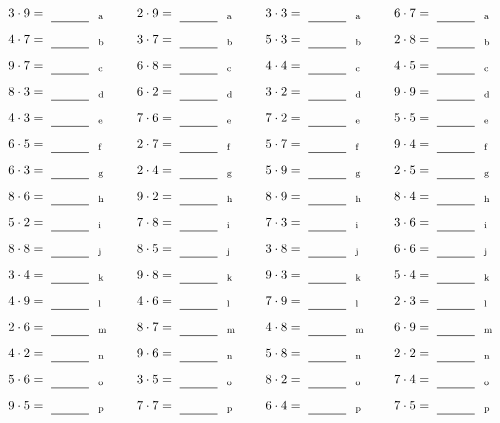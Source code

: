 \documentclass
[
  draft    = true,
  fontsize = 11pt,
  parskip  = half-
]
{scrartcl}
\begin{document}
\par\vfill\par
\begin{align*}
    \pline{3\cdot9}&=\rline{a}
  & \pline{2\cdot9}&=\rline{a}
  & \pline{3\cdot3}&=\rline{a}
  & \pline{6\cdot7}&=\rline{a} \\[1ex]
    \pline{4\cdot7}&=\rline{b}
  & \pline{3\cdot7}&=\rline{b}
  & \pline{5\cdot3}&=\rline{b}
  & \pline{2\cdot8}&=\rline{b} \\[1ex]
    \pline{9\cdot7}&=\rline{c}
  & \pline{6\cdot8}&=\rline{c}
  & \pline{4\cdot4}&=\rline{c}
  & \pline{4\cdot5}&=\rline{c} \\[1ex]
    \pline{8\cdot3}&=\rline{d}
  & \pline{6\cdot2}&=\rline{d}
  & \pline{3\cdot2}&=\rline{d}
  & \pline{9\cdot9}&=\rline{d} \\[1ex]
    \pline{4\cdot3}&=\rline{e}
  & \pline{7\cdot6}&=\rline{e}
  & \pline{7\cdot2}&=\rline{e}
  & \pline{5\cdot5}&=\rline{e} \\[1ex]
    \pline{6\cdot5}&=\rline{f}
  & \pline{2\cdot7}&=\rline{f}
  & \pline{5\cdot7}&=\rline{f}
  & \pline{9\cdot4}&=\rline{f} \\[1ex]
    \pline{6\cdot3}&=\rline{g}
  & \pline{2\cdot4}&=\rline{g}
  & \pline{5\cdot9}&=\rline{g}
  & \pline{2\cdot5}&=\rline{g} \\[1ex]
    \pline{8\cdot6}&=\rline{h}
  & \pline{9\cdot2}&=\rline{h}
  & \pline{8\cdot9}&=\rline{h}
  & \pline{8\cdot4}&=\rline{h} \\[1ex]
    \pline{5\cdot2}&=\rline{i}
  & \pline{7\cdot8}&=\rline{i}
  & \pline{7\cdot3}&=\rline{i}
  & \pline{3\cdot6}&=\rline{i} \\[1ex]
    \pline{8\cdot8}&=\rline{j}
  & \pline{8\cdot5}&=\rline{j}
  & \pline{3\cdot8}&=\rline{j}
  & \pline{6\cdot6}&=\rline{j} \\[1ex]
    \pline{3\cdot4}&=\rline{k}
  & \pline{9\cdot8}&=\rline{k}
  & \pline{9\cdot3}&=\rline{k}
  & \pline{5\cdot4}&=\rline{k} \\[1ex]
    \pline{4\cdot9}&=\rline{l}
  & \pline{4\cdot6}&=\rline{l}
  & \pline{7\cdot9}&=\rline{l}
  & \pline{2\cdot3}&=\rline{l} \\[1ex]
    \pline{2\cdot6}&=\rline{m}
  & \pline{8\cdot7}&=\rline{m}
  & \pline{4\cdot8}&=\rline{m}
  & \pline{6\cdot9}&=\rline{m} \\[1ex]
    \pline{4\cdot2}&=\rline{n}
  & \pline{9\cdot6}&=\rline{n}
  & \pline{5\cdot8}&=\rline{n}
  & \pline{2\cdot2}&=\rline{n} \\[1ex]
    \pline{5\cdot6}&=\rline{o}
  & \pline{3\cdot5}&=\rline{o}
  & \pline{8\cdot2}&=\rline{o}
  & \pline{7\cdot4}&=\rline{o} \\[1ex]
    \pline{9\cdot5}&=\rline{p}
  & \pline{7\cdot7}&=\rline{p}
  & \pline{6\cdot4}&=\rline{p}
  & \pline{7\cdot5}&=\rline{p}
\end{align*}
\end{document}
